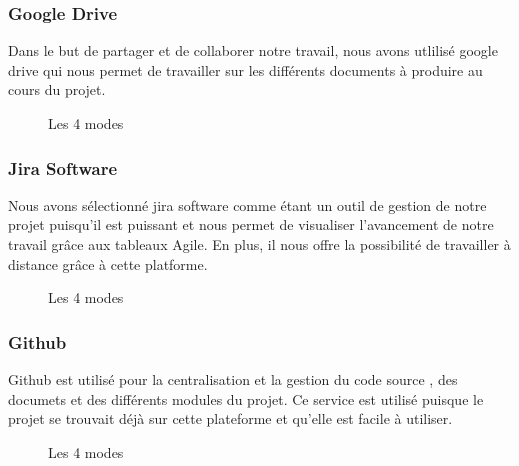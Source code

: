 	\subsubsection{Google Drive}
	Dans le but de partager et de collaborer notre travail, nous avons utlilisé google drive qui nous permet de travailler sur les différents documents à produire au cours du projet.
	\begin{figure}[h]
		\begin{center}
			\centering
		\end{center}
		\caption{Les 4 modes}
	\end{figure}
	\subsubsection{Jira Software}
	Nous avons sélectionné jira software comme étant un outil de gestion de notre projet puisqu'il est  puissant et nous permet de visualiser l'avancement de notre travail grâce aux tableaux Agile. En plus, il nous offre la possibilité de travailler à distance grâce à cette platforme.
	\begin{figure}[h]
		\begin{center}
			\centering
		\end{center}
		\caption{Les 4 modes}
	\end{figure}
	\subsubsection{Github}
	Github est utilisé pour la centralisation et la gestion du code source , des documets et des différents modules du projet. Ce service est utilisé puisque le projet se trouvait déjà sur cette plateforme et qu’elle est facile à utiliser.
	\begin{figure}[h]
		\begin{center}
			\centering
		\end{center}
		\caption{Les 4 modes}
	\end{figure}

